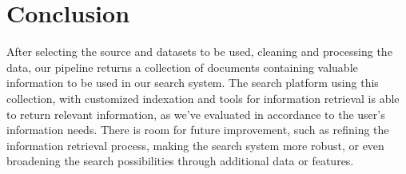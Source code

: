 \section{Conclusion}

After selecting the source and datasets to be used, cleaning and processing the data, our pipeline returns a collection of documents containing valuable information to be used in our search system. The search platform using this collection, with customized indexation and tools for information retrieval is able to return relevant information, as we've evaluated in accordance to the user's information needs. There is room for future improvement, such as refining the information retrieval process, making the search system more robust, or even broadening the search possibilities through additional data or features.